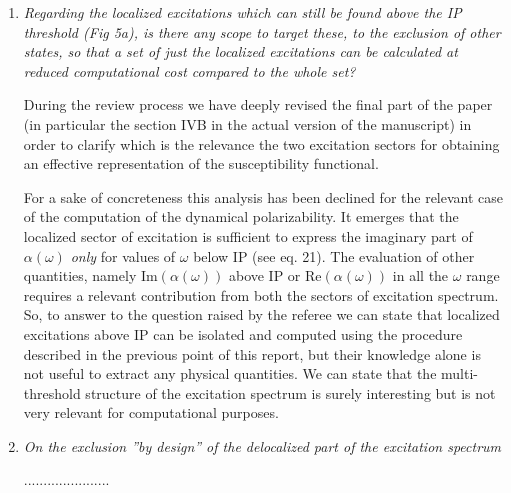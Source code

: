 \documentclass[11pt,a4paper]{article}
\begin{document}
\begin{enumerate}
\item \emph{Regarding the localized excitations which can still be found above the IP threshold (Fig 5a), is there any scope to target these, to the
exclusion of other states, so that a set of just the localized excitations can be calculated at reduced computational cost compared to the whole set?}

 During the review process we have deeply revised the final part of the paper (in particular the section IVB in the actual version of the manuscript) in order to clarify which is the relevance the two excitation sectors for obtaining an effective representation of the susceptibility functional.
 
 For a sake of concreteness this analysis has been declined for the relevant case of the computation of the dynamical polarizability. It emerges that the localized
 sector of excitation is sufficient to express the imaginary part of $\alpha(\omega)$ \emph{only} for values of $\omega$ below IP (see eq. 21). The evaluation of
 other quantities, namely $\mathrm{Im}(\alpha(\omega))$ above IP or $\mathrm{Re}(\alpha(\omega))$ in all the $\omega$ range requires a relevant contribution from
 both the sectors of excitation spectrum. So, to answer to the question raised by the referee we can state that localized excitations above IP can be isolated and computed using the procedure described in the previous point of this report, but their knowledge alone is not useful to extract any physical quantities.
 We can state that the multi-threshold structure of the excitation spectrum is surely interesting but is not very relevant for computational purposes.   
 
 \item \emph{On the exclusion ''by design'' of the delocalized part of the excitation spectrum}
 
 ......................
 

\end{enumerate}
\end{document}
